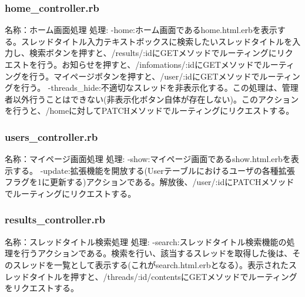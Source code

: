 \documentclass[a4j]{jarticle}
\begin{document}



\subsubsection{home\_controller.rb}
\noindent 名称：ホーム画面処理 \newline
処理:\newline
-home:ホーム画面であるhome.html.erbを表示する。スレッドタイトル入力テキストボックスに検索したいスレッドタイトルを入力し、検索ボタンを押すと、/results/:idにGETメソッドでルーティングにリクエストを行う。お知らせを押すと、/infomations/:idにGETメソッドでルーティングを行う。マイページボタンを押すと、/user/:idにGETメソッドでルーティングを行う。\newline
-threads\_hide:不適切なスレッドを非表示化する。この処理は、管理者以外行うことはできない(非表示化ボタン自体が存在しない)。このアクションを行うと、/homeに対してPATCHメソッドでルーティングにリクエストする。



\subsubsection{users\_controller.rb}
\noindent 名称：マイページ画面処理 \newline
処理:\newline
-show:マイページ画面であるshow.html.erbを表示する。\newline
-update:拡張機能を開放する(Userテーブルにおけるユーザの各種拡張フラグを1に更新する)アクションである。解放後、/user/:idにPATCHメソッドでルーティングにリクエストする。


\subsubsection{results\_controller.rb}
\noindent 名称：スレッドタイトル検索処理 \newline
処理:\newline
-search:スレッドタイトル検索機能の処理を行うアクションである。検索を行い、該当するスレッドを取得した後は、そのスレッドを一覧として表示する(これがsearch.html.erbとなる）。表示されたスレッドタイトルを押すと、/threads/:id/contentsにGETメソッドでルーティングをリクエストする。\newline
\end{document}
